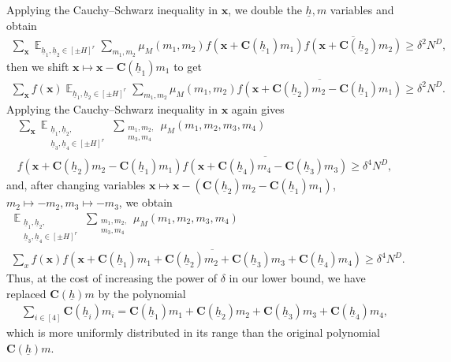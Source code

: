 \documentclass[11pt]{amsart}
\theoremstyle{definition}
\DeclareMathOperator*{\E}{\mathbb{E}}
\newcommand{\bc}{{\textbf{C}}}
\newcommand{\bx}{{\textbf{x}}}
\newcommand{\uh}{{\underline{h}}}
\newcommand{\brac}[1]{\mathopen{}\left( #1 \mathclose{}\right)}
\begin{document}
Applying the Cauchy--Schwarz inequality in $\bx$, we double the $\uh, m$ variables and obtain
\begin{align*}
    \sum_\bx \E_{\uh_1, \uh_2\in[\pm H]^r}\sum_{m_1, m_2}\mu_M(m_1, m_2) f(\bx + \bc(\uh_1) m_1)\overline{f(\bx + \bc(\uh_2) m_2)}\geq \delta^2 N^D,
\end{align*}
then we shift $\bx\mapsto \bx-\bc(\uh_1)m_1$ to get
\begin{align*}
    \sum_\bx f(\bx) \E_{\uh_1, \uh_2\in[\pm H]^r}\sum_{m_1, m_2}\mu_M(m_1, m_2)\overline{f(\bx + \bc(\uh_2) m_2-\bc(\uh_1) m_1)}\geq \delta^2 N^D.
\end{align*}
Applying the Cauchy--Schwarz inequality in $\bx$ again gives
\begin{multline*}
    \sum_\bx \E_{\substack{\uh_{1}, \uh_{2},\\ \uh_{3}, \uh_{4}\in[\pm H]^r}}\sum_{\substack{m_{1}, m_{2},\\ m_{3}, m_{4}}}\mu_M(m_{1}, m_{2}, m_{3}, m_{4})\\
    f(\bx + \bc(\uh_{2}) m_{2}-\bc(\uh_{1}) m_{1})\overline{f(\bx + \bc(\uh_{4}) m_{4}-\bc(\uh_{3}) m_{3})} \geq \delta^4 N^D,
\end{multline*}
and, after changing variables $\bx\mapsto \bx - (\bc(\uh_{2}) m_{2}-\bc(\uh_{1}) m_{1})$, $m_2\mapsto -m_2, m_3\mapsto -m_3$, we obtain
\begin{multline*}
    \E_{\substack{\uh_{1}, \uh_{2},\\ \uh_{3}, \uh_{4}\in[\pm H]^r}}\sum_{\substack{m_{1}, m_{2},\\ m_{3}, m_{4}}}\mu_M(m_{1}, m_{2}, m_{3}, m_{4})\\
    \sum_x f(\bx)\overline{f\brac{\bx+\bc(\uh_{1}) m_{1}+\bc(\uh_{2}) m_{2} + \bc(\uh_{3}) m_{3}+\bc(\uh_{4}) m_{4}}}\geq \delta^{4} N^D.
\end{multline*}
Thus, at the cost of increasing the power of $\delta$ in our lower bound, we have replaced $\bc(\uh) m$ by the polynomial 
\begin{align*}
    \sum\limits_{i\in[4]}\bc(\uh_i)m_{i} = \bc(\uh_{1}) m_{1}+\bc(\uh_{2}) m_{2} + \bc(\uh_{3}) m_{3}+\bc(\uh_{4}) m_{4},
\end{align*}
 which is more uniformly distributed in its range than the original polynomial $\bc(\uh) m$. 
\end{document}
